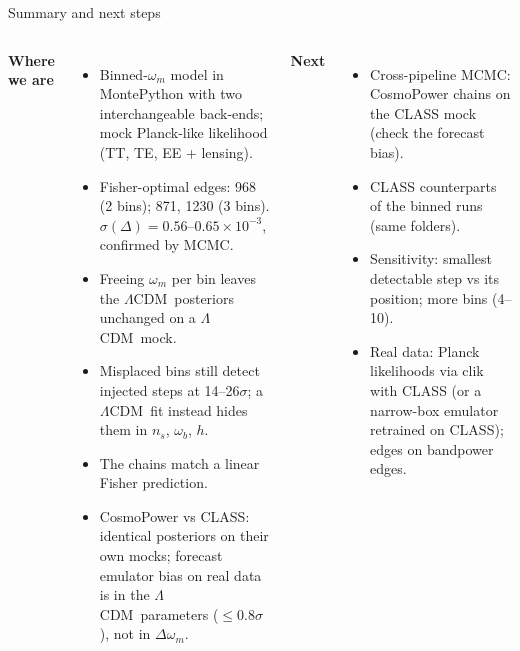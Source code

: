 \documentclass[aspectratio=169,10pt]{beamer}
\newcommand{\om}{\omega_m}
\newcommand{\lcdm}{$\Lambda$CDM}
\begin{document}
\begin{frame}{Summary and next steps}
\begin{columns}[T]
{\bfseries Where we are}
\begin{itemize}\small
  \item Binned-$\om$ model in MontePython with two interchangeable back-ends; mock Planck-like likelihood (TT, TE, EE + lensing).
  \item Fisher-optimal edges: 968 (2 bins); 871, 1230 (3 bins). $\sigma(\Delta)=0.56$--$0.65\times10^{-3}$, confirmed by MCMC.
  \item Freeing $\om$ per bin leaves the \lcdm\ posteriors unchanged on a \lcdm\ mock.
  \item Misplaced bins still detect injected steps at 14--26$\sigma$; a \lcdm\ fit instead hides them in $n_s$, $\omega_b$, $h$.
  \item The chains match a linear Fisher prediction.
  \item CosmoPower vs CLASS: identical posteriors on their own mocks; forecast emulator bias on real data is in the \lcdm\ parameters ($\le0.8\sigma$),
  not in $\Delta\om$.
\end{itemize}
{\bfseries Next}
\begin{itemize}\small
  \item Cross-pipeline MCMC: CosmoPower chains on the CLASS mock (check the forecast bias).
  \item CLASS counterparts of the binned runs (same folders).
  \item Sensitivity: smallest detectable step vs its position; more bins (4--10).
  \item Real data: Planck likelihoods via clik with CLASS (or a narrow-box emulator retrained on CLASS); edges on bandpower edges.
\end{itemize}
\end{columns}
\end{frame}

\appendix
\begin{frame}[plain]
  \vfill{}\vfill
\end{frame}
\end{document}
